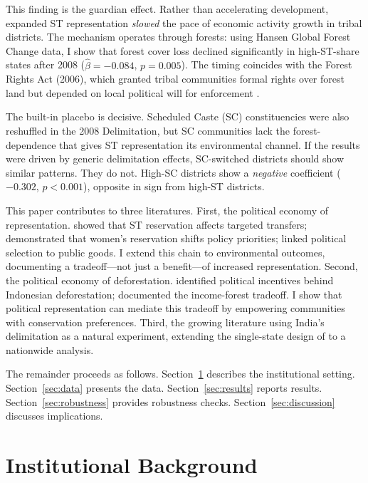 \documentclass[12pt]{article}
\begin{document}
This finding is the guardian effect. Rather than accelerating development, expanded ST representation \textit{slowed} the pace of economic activity growth in tribal districts. The mechanism operates through forests: using Hansen Global Forest Change data, I show that forest cover loss declined significantly in high-ST-share states after 2008 ($\hat{\beta} = -0.084$, $p = 0.005$). The timing coincides with the Forest Rights Act (2006), which granted tribal communities formal rights over forest land but depended on local political will for enforcement \citep{gulzar2020}.

The built-in placebo is decisive. Scheduled Caste (SC) constituencies were also reshuffled in the 2008 Delimitation, but SC communities lack the forest-dependence that gives ST representation its environmental channel. If the results were driven by generic delimitation effects, SC-switched districts should show similar patterns. They do not. High-SC districts show a \textit{negative} coefficient ($-0.302$, $p < 0.001$), opposite in sign from high-ST districts.

This paper contributes to three literatures. First, the political economy of representation. \citet{pande2003} showed that ST reservation affects targeted transfers; \citet{chattopadhyay2004} demonstrated that women's reservation shifts policy priorities; \citet{besley2012} linked political selection to public goods. I extend this chain to environmental outcomes, documenting a tradeoff---not just a benefit---of increased representation. Second, the political economy of deforestation. \citet{burgess2012} identified political incentives behind Indonesian deforestation; \citet{foster2003} documented the income-forest tradeoff. I show that political representation can mediate this tradeoff by empowering communities with conservation preferences. Third, the growing literature using India's delimitation as a natural experiment, extending the single-state design of \citet{agarwal2026} to a nationwide analysis.

The remainder proceeds as follows. Section~\ref{sec:background} describes the institutional setting. Section~\ref{sec:data} presents the data. Section~\ref{sec:results} reports results. Section~\ref{sec:robustness} provides robustness checks. Section~\ref{sec:discussion} discusses implications.


\section{Institutional Background}\label{sec:background}
\end{document}
